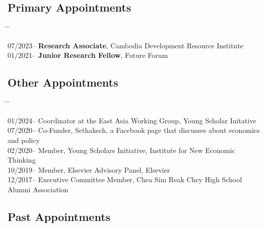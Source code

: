 \documentclass[10pt,a4paper]{article}
\newcommand{\tabbedblock}[1]{

	\begin{tabbing}
		\hspace{3cm} \= \hspace{4cm} \= \kill
		#1
	\end{tabbing}
}
\begin{document}

\subsection*{Primary Appointments}	

\tabbedblock{
		07/2023--  \> \textbf{Research Associate}, Cambodia Development Resource Institute \\
	
		01/2021--  \> \textbf{Junior Research Fellow}, Future Forum \\
}
	
\vspace{-2em}	
\subsection*{Other Appointments}

\tabbedblock{


	01/2024-- \> Coordinator at the East Asia Working Group, Young Scholar Initative\\
	
	07/2020-- \> Co-Funder, Sethakech, a Facebook page that discusses about economics and policy\\

	02/2020-- \> Member, Young Scholars Initiative, Institute for New Economic Thinking\\

	10/2019-- \> Member, Elsevier Advisory Panel, Elsevier\\


	12/2017-- \> Executive Committee Member, Chea Sim Reak Chey High School Alumni Association
}
	
\subsection*{Past Appointments}
\end{document}
